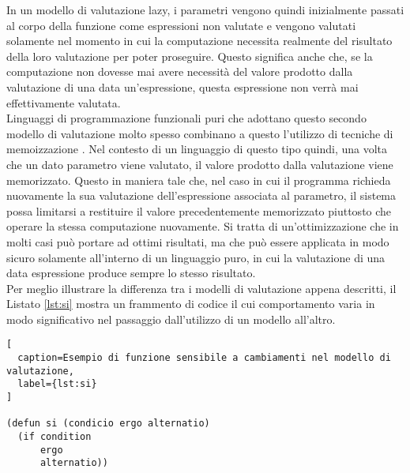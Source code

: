 In un modello di valutazione lazy, i parametri vengono quindi inizialmente
passati al corpo della funzione come espressioni non valutate e vengono valutati
solamente nel momento in cui la computazione necessita realmente del risultato
della loro valutazione per poter proseguire. Questo significa anche che, se la
computazione non dovesse mai avere necessità del valore prodotto dalla
valutazione di una data un'espressione, questa espressione non verrà mai
effettivamente valutata.\\

Linguaggi di programmazione funzionali puri che adottano questo secondo modello
di valutazione molto spesso combinano a questo l'utilizzo di tecniche di
memoizzazione \cite{Geyer-Schulz:1989:MEM:379209.379211}. Nel contesto di un
linguaggio di questo tipo quindi, una volta che un dato parametro viene
valutato, il valore prodotto dalla valutazione viene memorizzato. Questo in
maniera tale che, nel caso in cui il programma richieda nuovamente la sua
valutazione dell'espressione associata al parametro, il sistema possa limitarsi
a restituire il valore precedentemente memorizzato piuttosto che operare la
stessa computazione nuovamente. Si tratta di un'ottimizzazione che in molti casi
può portare ad ottimi risultati, ma che può essere applicata in modo sicuro
solamente all'interno di un linguaggio puro, in cui la valutazione di una data
espressione produce sempre lo stesso risultato.\\

Per meglio illustrare la differenza tra i modelli di valutazione appena
descritti, il Listato \ref{lst:si} mostra un frammento di codice il cui
comportamento varia in modo significativo nel passaggio dall'utilizzo di un
modello all'altro.

\begin{lstlisting}[
  caption=Esempio di funzione sensibile a cambiamenti nel modello di valutazione,
  label={lst:si}
]

(defun si (condicio ergo alternatio)
  (if condition
      ergo
      alternatio))

\end{lstlisting}

